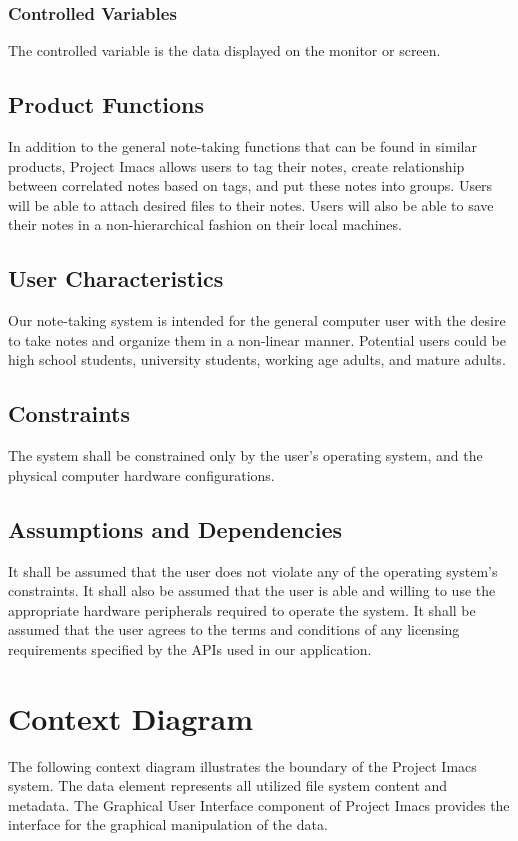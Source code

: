 \documentclass{article}
\begin{document}
\subsubsection{Controlled Variables}
The controlled variable is the data displayed on the monitor or screen.

\subsection{Product Functions}
In addition to the general note-taking functions that can be found in similar products, Project Imacs allows users to tag their notes, create relationship between correlated notes based on tags, and put these notes into groups. Users will be able to attach desired files to their notes. Users will also be able to save their notes in a non-hierarchical fashion on their local machines.

\subsection{User Characteristics}
Our note-taking system is intended for the general computer user with the desire to take notes and organize them in a non-linear manner. Potential users could be high school students, university students, working age adults, and mature adults.

\subsection{Constraints}
The system shall be constrained only by the user's operating system, and the physical computer hardware configurations.

\subsection{Assumptions and Dependencies}
It shall be assumed that the user does not violate any of the operating system's constraints. It shall also be assumed that the user is able and willing to use the appropriate hardware peripherals required to operate the system.
It shall be assumed that the user agrees to the terms and conditions of any licensing requirements specified by the APIs used in our application.

\section{Context Diagram}
The following context diagram illustrates the boundary of the Project Imacs system. The data element represents all utilized file system content and metadata. The Graphical User Interface component of Project Imacs provides the interface for the graphical manipulation of the data.
\end{document}
